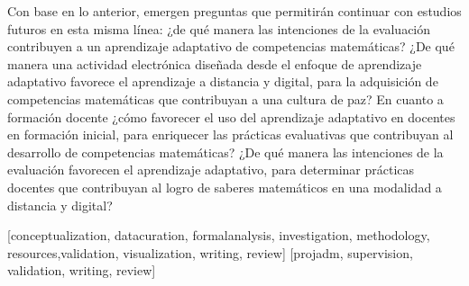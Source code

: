 \documentclass[spanish]{textolivre}
\begin{document}
Con base en lo anterior, emergen preguntas que permitirán continuar con estudios futuros en esta misma línea: ¿de qué manera las intenciones de la evaluación contribuyen a un aprendizaje adaptativo de competencias matemáticas? ¿De qué manera una actividad electrónica diseñada desde el enfoque de aprendizaje adaptativo favorece el aprendizaje a distancia y digital, para la adquisición de competencias matemáticas que contribuyan a una cultura de paz? En cuanto a formación docente ¿cómo favorecer el uso del aprendizaje adaptativo en docentes en formación inicial, para enriquecer las prácticas evaluativas que contribuyan al desarrollo de competencias matemáticas? ¿De qué manera las intenciones de la evaluación favorecen el aprendizaje adaptativo, para determinar prácticas docentes que contribuyan al logro de saberes matemáticos en una modalidad a distancia y digital?


\printbibliography\label{sec-bib}

\begin{contributors}
[conceptualization, datacuration, formalanalysis, investigation, methodology, resources,validation, visualization, writing, review]
[projadm, supervision, validation, writing, review]
\end{contributors}
\end{document}
